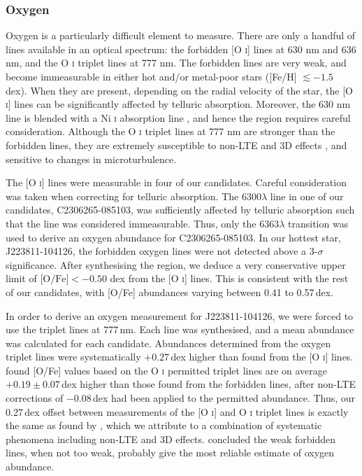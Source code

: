 \documentclass{emulateapj}
\begin{document}
\subsubsection{Oxygen}
\label{sec:oxygen-abundances}
Oxygen is a particularly difficult element to measure. There are only a handful of lines available in an optical spectrum: the forbidden [O \textsc{i}] lines at 630 nm and 636 nm, and the O \textsc{i} triplet lines at 777 nm. The forbidden lines are very weak, and become immeasurable in either hot and/or metal-poor stars ([Fe/H] $\lesssim -1.5$ dex). When they are present, depending on the radial velocity of the star, the [O \textsc{i}] lines can be significantly affected by telluric absorption. Moreover, the 630 nm line is blended with a Ni \textsc{i} absorption line \citep{allende-prieto;et-al_2001}, and hence the region requires careful consideration. Although the O \textsc{i} triplet lines at 777 nm are stronger than the forbidden lines, they are extremely susceptible to non-LTE and 3D effects \citep{asplund;perez_2001}, and sensitive to changes in microturbulence. 

The [O \textsc{i}] lines were measurable in four of our candidates. Careful consideration was taken when correcting for telluric absorption. The 6300$\lambda$ line in one of our candidates, C2306265-085103, was sufficiently affected by telluric absorption such that the line was considered immeasurable. Thus, only the 6363$\lambda$ transition was used to derive an oxygen abundance for C2306265-085103. In our hottest star, J223811-104126, the forbidden oxygen lines were not detected above a 3-$\sigma$ significance. After synthesising the region, we deduce a very conservative upper limit of $\mbox{[O/Fe]} < -0.50$ dex from the [O \textsc{i}] lines. This is consistent with the rest of our candidates, with [O/Fe] abundances varying between 0.41 to 0.57\,dex.

In order to derive an oxygen measurement for J223811-104126, we were forced to use the triplet lines at 777\,nm. Each line was synthesised, and a mean abundance was calculated for each candidate. Abundances determined from the oxygen triplet lines were systematically $+0.27$\,dex higher than found from the [O \textsc{i}] lines. \citet{perez;et-al_2006} found [O/Fe] values based on the O \textsc{i} permitted triplet lines are on average $+0.19 \pm 0.07$\,dex higher than those found from the forbidden lines, after non-LTE corrections of $-$0.08\,dex had been applied to the permitted abundance.  Thus, our 0.27\,dex offset between measurements of the [O \textsc{i}] and O \textsc{i} triplet lines is exactly the same as found by \citet{perez;et-al_2006}, which we attribute to a combination of systematic phenomena including non-LTE and 3D effects. \citet{perez;et-al_2006} concluded the weak forbidden lines, when not too weak, probably give the most reliable estimate of oxygen abundance.
\end{document}
